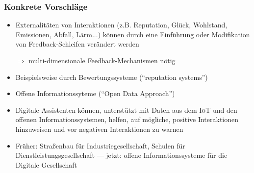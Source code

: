 \begin{frame}
	\frametitle{Konkrete Vorschläge}
	\begin{itemize}[<+->]
		\item
			Externalitäten von Interaktionen (z.B. Reputation, Glück, Wohlstand, Emissionen, Abfall, Lärm...) können durch eine Einführung oder Modifikation von Feedback-Schleifen verändert werden

		\item[$\Rightarrow$] multi-dimensionale Feedback-Mechanismen nötig
		\item
			Beispielsweise durch Bewertungssysteme (\enquote{reputation systems})
		\item
			Offene Informationssyteme (\enquote{Open Data Approach}) 
		\item
			Digitale Assistenten können, unterstützt mit Daten aus dem \textsc{IoT} und den offenen Informationssystemen, helfen, auf mögliche, positive Interaktionen hinzuweisen und vor negativen Interaktionen zu warnen
		\item
			Früher: Straßenbau für Industriegesellschaft, Schulen für Dienstleistungsgesellschaft --- jetzt: offene Informationssysteme für die Digitale Gesellschaft

	\end{itemize}
\end{frame}




